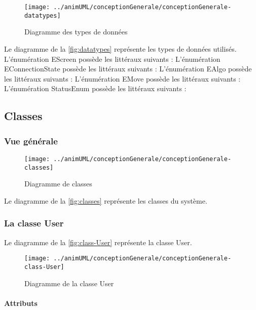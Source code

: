 \begin{figure}[H]
	\centering
	\texttt{[image: ../animUML/conceptionGenerale/conceptionGenerale-datatypes]}
	\caption{Diagramme des types de données}
	\label{fig:datatypes}
\end{figure}
Le diagramme de la \autoref{fig:datatypes} représente les types de données utilisés.
\newline
L'énumération EScreen possède les littéraux suivants :
\enumEScreenLiteralDescriptions
L'énumération EConnectionState possède les littéraux suivants :
\enumEConnectionStateLiteralDescriptions
L'énumération EAlgo possède les littéraux suivants :
\enumEAlgoLiteralDescriptions
L'énumération EMove possède les littéraux suivants :
\enumEMoveLiteralDescriptions
L'énumération StatusEnum possède les littéraux suivants :
\enumStatusEnumLiteralDescriptions

\subsection{Classes}

\subsubsection{Vue générale}

\begin{figure}[H]
	\centering
	\texttt{[image: ../animUML/conceptionGenerale/conceptionGenerale-classes]}
	\caption{Diagramme de classes}
	\label{fig:classes}
\end{figure}
Le diagramme de la \autoref{fig:classes} représente les classes du système.

\subsubsection{La classe User}

Le diagramme de la \autoref{fig:class-User} représente la classe User.
\begin{figure}[H]
	\centering
	\texttt{[image: ../animUML/conceptionGenerale/conceptionGenerale-class-User]}
	\caption{Diagramme de la classe User}
	\label{fig:class-User}
\end{figure}


\paragraph{Attributs}
\classUserProperties
